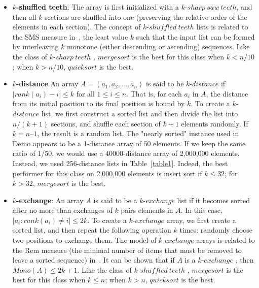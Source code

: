 \documentclass[AMA,STIX1COL]{WileyNJD-v2}
\newcommand{\ksha}{$k$-$sharp\ teeth$ }
\newcommand{\kshu}{$k$-$shuffled\ teeth$ }
\newcommand{\kdis}{$k$-$distance$ }
\newcommand{\kexc}{$k$-$exchange$ }
\newcommand{\qusort}{$quicksort$ }
\newcommand{\msort}{$mergesort$ }
\begin{document}
\begin{itemize}
\item \textbf{$k$-shuffled teeth}: 
The array is first initialized with a $k$-$sharp\ saw\ teeth$, and then all $k$ sections are shuffled into one (preserving the relative order of the elements in each section).
The concept of \kshu lists is related to the SMS measure in~\cite{moffat1996splaysort}, the least value $k$ such that the input list can be formed by interleaving $k$ monotone (either descending or ascending) sequences.  
Like the class of \ksha, \msort is the best for this class when $k < n/10$; when $k > n/10$, \qusort is the best. 

\item \textbf{$k$-distance}
An array $A = (a_1, a_2, ..., a_n)$ is said to be \kdis if $|rank(a_i) -  i| \leq k$ for all $1\leq i \leq n$. 
That is, for each $a_i$ in $A$, the distance from its initial position to its final position is bound by $k$. 
To create a \kdis list, we first construct a sorted list and then divide the list into $n/(k+1)$ sections, and shuffle each section of $k+1$ elements randomly.  
If $k = n – 1$, the result is a random list. 
The "nearly sorted" instance used in Demo appears to be a 1-distance array of 50 elements.  
If we keep the same ratio of 1/50, we would use a 40000-distance array of 2,000,000 elements. 
Instead, we used 256-distance lists in Table~\ref{table1}. 
Indeed, the best performer for this class on 2,000,000 elements is insert sort if $k \leq 32$; for $k > 32$, \msort is the best.

\item \textbf{$k$-exchange}: An array $A$ is said to be a \kexc list if it becomes sorted after no more than exchanges of $k$ pairs elements in $A$. 
In this case,  $|a_i : rank(a_i) \neq i | \leq 2k$.  
To create a \kexc array, we first create a sorted list, and then repeat the following operation $k$ times: randomly choose two positions to exchange them. 
The model of \kexc arrays is related to the Rem measure (the minimal number of items that must be removed to leave a sorted sequence) in~\cite{moffat1996splaysort}. 
It can be shown that if $A$ is a \kexc, then $Mono(A) \leq 2k+1$. 
Like the class of \kshu, \msort is the best for this class when $k \leq n$; when $k > n$, \qusort is the best.                                                
\end{itemize}              
\end{document}
